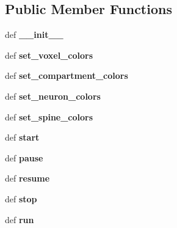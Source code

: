 \subsection*{Public Member Functions}
\begin{DoxyCompactItemize}
\item 
\hypertarget{classmoogli_1_1NetworkViewer_af7c47456b0aa4c62e803bf70f77c3bdb}{def {\bfseries \-\_\-\-\_\-init\-\_\-\-\_\-}}\label{classmoogli_1_1NetworkViewer_af7c47456b0aa4c62e803bf70f77c3bdb}

\item 
\hypertarget{classmoogli_1_1NetworkViewer_a618f6cbd657193af5b9d554426877f19}{def {\bfseries set\-\_\-voxel\-\_\-colors}}\label{classmoogli_1_1NetworkViewer_a618f6cbd657193af5b9d554426877f19}

\item 
\hypertarget{classmoogli_1_1NetworkViewer_a55b6887b398f9aaf44e25ef1a0f4e8cc}{def {\bfseries set\-\_\-compartment\-\_\-colors}}\label{classmoogli_1_1NetworkViewer_a55b6887b398f9aaf44e25ef1a0f4e8cc}

\item 
\hypertarget{classmoogli_1_1NetworkViewer_a2485189dba1e9618e2f270a559fefc90}{def {\bfseries set\-\_\-neuron\-\_\-colors}}\label{classmoogli_1_1NetworkViewer_a2485189dba1e9618e2f270a559fefc90}

\item 
\hypertarget{classmoogli_1_1NetworkViewer_a989fd428355fd0877454c8f6f6e4e95f}{def {\bfseries set\-\_\-spine\-\_\-colors}}\label{classmoogli_1_1NetworkViewer_a989fd428355fd0877454c8f6f6e4e95f}

\item 
\hypertarget{classmoogli_1_1NetworkViewer_a457493678bc3bdb6e4121c1ce92a3296}{def {\bfseries start}}\label{classmoogli_1_1NetworkViewer_a457493678bc3bdb6e4121c1ce92a3296}

\item 
\hypertarget{classmoogli_1_1NetworkViewer_aae7613a23494d23a715d79191037d018}{def {\bfseries pause}}\label{classmoogli_1_1NetworkViewer_aae7613a23494d23a715d79191037d018}

\item 
\hypertarget{classmoogli_1_1NetworkViewer_a1789bc119a874646fbf7f0aafb73a226}{def {\bfseries resume}}\label{classmoogli_1_1NetworkViewer_a1789bc119a874646fbf7f0aafb73a226}

\item 
\hypertarget{classmoogli_1_1NetworkViewer_aeaf660f2680af57263719fd9e7f7f6be}{def {\bfseries stop}}\label{classmoogli_1_1NetworkViewer_aeaf660f2680af57263719fd9e7f7f6be}

\item 
\hypertarget{classmoogli_1_1NetworkViewer_a7e44ace5ec149b4ef37e04232a9acc40}{def {\bfseries run}}\label{classmoogli_1_1NetworkViewer_a7e44ace5ec149b4ef37e04232a9acc40}

\end{DoxyCompactItemize}
